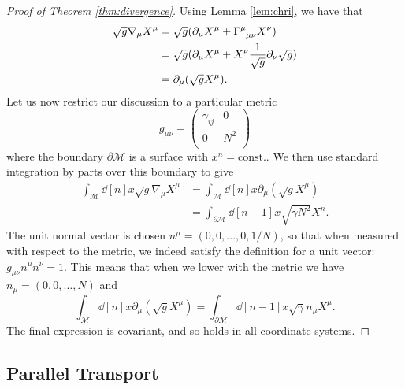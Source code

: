 
\begin{proof}[Proof of Theorem \ref{thm:divergence}]
  Using Lemma \ref{lem:chri}, we have that 
  \begin{align}
    \sqrt{g} \nabla_{\mu} X^\mu &= \sqrt{g} (\partial_\mu X^\mu + \Gamma \indices{^\mu_\mu_\nu} X^\nu) \\
				&= \sqrt{g} (\partial_\mu X^\mu + X^\nu \frac{1}{\sqrt{g}} \partial_\nu \sqrt{g}) \\
				&= \partial_\mu (\sqrt{g} X^\mu).
  \end{align}
  Let us now restrict our discussion to a particular metric
  \begin{equation}
    g_{\mu\nu} = 
    \begin{pmatrix}
     \gamma_{ij} & 0 \\
     0 & N^2 \\
    \end{pmatrix}
  \end{equation}
  where the boundary $\partial \mathcal{M}$ is a surface with $x^n = \text{const.}$.
  We then use standard integration by parts over this boundary to give
  \begin{align}
    \int_{\mathcal{M}} \dd[n]{x} \sqrt{g} \nabla_{\mu} X^\mu &= \int_{\mathcal{M}} \dd[n]{x} \partial_\mu (\sqrt{g} X^\mu) \\
							     &= \int_{\partial \mathcal{M}} \dd[n-1]{x} \sqrt{\gamma N^2} X^n.
  \end{align}
  The unit normal vector is chosen $n^\mu = (0, 0, \dots, 0, 1/N)$, so that when measured with respect to the metric, we indeed satisfy the definition for a unit vector: $g_{\mu\nu} n^\mu n^\nu = 1$. This means that when we lower with the metric we have $n_\mu = (0, 0, \dots, N)$ and 
  \begin{equation}
    \int_{\mathcal{M}} \dd[n]{x} \partial_\mu (\sqrt{g} X^\mu) = \int_{\partial \mathcal{M}} \dd[n-1]{x} \sqrt{\gamma} n_\mu X^\mu.
  \end{equation}
  The final expression is covariant, and so holds in all coordinate systems.
\end{proof}

\subsection{Parallel Transport}%
\label{sub:parallel_transport}

